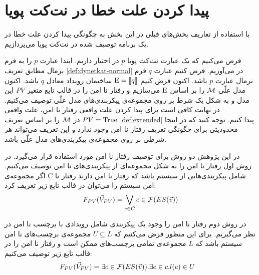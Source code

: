 \section{پیدا کردن علت خطا در نت‌کت پویا}

با استفاده از تعاریف بخش‌های قبلی در این بخش به چگونگی پیدا کردن علت خطا در یک برنامه توصیف شده در نت‌کت پویا می‌پردازیم.

فرض می‌کنیم که یک عبارت نت‌کت پویا
$p$
در اختیار داریم.
ابتدا عبارت
$p$
را به فرم نرمال مطابق تعریف 
\ref{def:dynetkat-normal}
در می‌آوریم.
فرض کنیم عبارت 
$q$
فرم نرمال
عبارت 
$p$
باشد.
اکنون فرض کنیم 
$\mathrm{E} = \llbracket q \rrbracket$
ساختمان رویداد معادل 
$q$
باشد.
اکنون مدل علّی 
$\mathcal{M}$
را بر اساس
$\mathrm{E}$
می‌سازیم و رفتار نا امن را در قالب تابع متغیر
$PV$
این مدل و به شکل یک شرط بر روی مجموعه‌ی پیکربندی‌های مدل علّی توصیف می‌کنیم.
در نهایت کافی است برای پیدا کردن علت واقعی رفتار نا امن، علت واقعی 
$PV = \mathrm{True}$
در 
$\mathcal{M}$
را بر اساس تعریف 
\ref{def:extended}
پیدا کنیم.
توجه کنید که در اینجا محدودیتی برای چگونگی تعریف رفتار نا امن وجود ندارد و این تعریف می‌تواند هر شرطی بر روی مجموعه‌ی پیکر‌بندی‌های مدل علّی باشد.

در این پژوهش دو روش برای توصیف رفتار نا امن مورد استفاده قرار می‌گیرد.
در روش اول رفتار نا امن را به شکل مجموعه‌ای از پیکر‌بندی‌های
نا امن توصیف می‌کنیم.
اگر مجموعه‌ی 
C
شامل پیکربندی‌هایی از سیستم باشد که رفتار نا امن دارند
رفتار نا امن سیستم را می‌توان در قالب تابع زیر تعریف کرد:
\begin{equation}
    \label{eq:unsafe}
    F_{PV}(\vec V_{PV}) = \bigvee_{c \in C} c \in \mathcal{F}(ES(\vec v))
\end{equation}

در روش دوم رفتار نا امن را وجود یک پیکربندی شامل رویدادی 
با برچسب نا امن در نظر می‌گیریم.
برای این منظور فرض می‌کنیم که 
$U \subseteq L$
مجموعه‌ی برچسب‌های نا امن سیستم باشد که 
$L$
مجموعه‌ی تمامی برچسب‌های ممکن است و رفتار نا امن را در قالب تابع
زیر توصیف می‌کنیم:
\begin{align*}
    F_{PV}(\vec V_{PV}) & = \exists c \in \mathcal{F}(ES(\vec v)).\exists e \in c.
    l(e) \in U
\end{align*}



